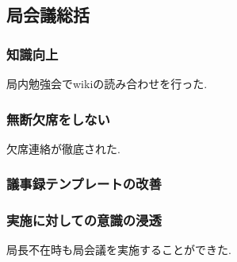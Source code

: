 \subsection*{局会議総括}


\subsubsection{知識向上}

局内勉強会でwikiの読み合わせを行った.

\subsubsection{無断欠席をしない}

欠席連絡が徹底された.

\subsubsection{議事録テンプレートの改善}

\subsubsection{実施に対しての意識の浸透}

局長不在時も局会議を実施することができた.